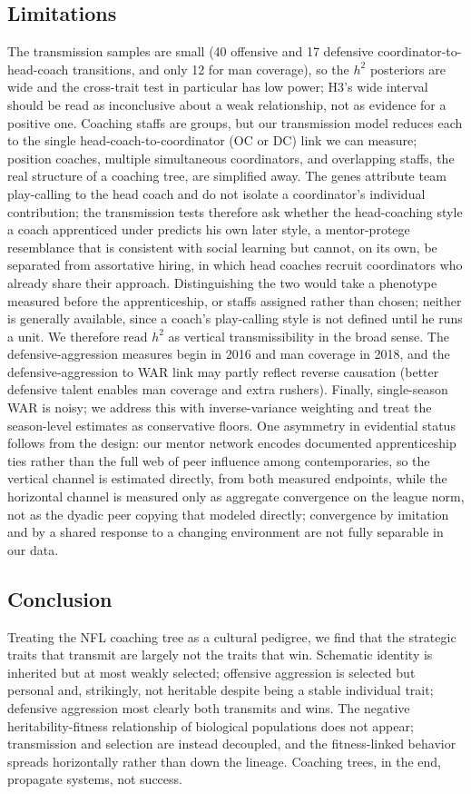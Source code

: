\documentclass[
  journal=ehs,
  manuscript=article,
  year=2026,
  volume=8,
]{cup-journal}
\begin{document}
\subsection{Limitations}
The transmission samples are small (40 offensive and 17 defensive
coordinator-to-head-coach transitions, and only 12 for man coverage), so the $h^{2}$
posteriors are wide and the
cross-trait test in particular has low power; H3's wide interval should be read as
inconclusive about a weak relationship, not as evidence for a positive one.
Coaching staffs are groups, but our transmission model reduces each to the single
head-coach-to-coordinator (OC or DC) link we can measure; position coaches, multiple
simultaneous coordinators, and overlapping staffs, the real structure of a coaching
tree, are simplified away. The genes attribute team play-calling to the head
coach and do not isolate a coordinator's individual contribution; the transmission
tests therefore ask whether the head-coaching style a coach apprenticed under
predicts his own later style, a mentor-protege resemblance that is consistent with
social learning but cannot, on its own, be separated from assortative hiring, in
which head coaches recruit coordinators who already share their approach.
Distinguishing the two would take a phenotype measured before the apprenticeship, or
staffs assigned rather than chosen; neither is generally available, since a coach's
play-calling style is not defined until he runs a unit. We therefore read $h^{2}$ as
vertical transmissibility in the broad sense. The
defensive-aggression measures begin in 2016 and man coverage in 2018, and the
defensive-aggression to WAR link may partly reflect reverse causation (better
defensive talent enables man coverage and extra rushers). Finally, single-season
WAR is noisy; we address this with inverse-variance weighting and treat the
season-level estimates as conservative floors. One asymmetry in evidential status
follows from the design: our mentor network encodes documented apprenticeship ties
rather than the full web of peer influence among contemporaries, so the vertical
channel is estimated directly, from both measured endpoints, while the horizontal
channel is measured only as aggregate convergence on the league norm, not as the
dyadic peer copying that \textcite{mesoudi2020} modeled directly; convergence by
imitation and by a shared response to a changing environment are not fully separable
in our data.

\subsection{Conclusion}
Treating the NFL coaching tree as a cultural pedigree, we find that the strategic
traits that transmit are largely not the traits that win. Schematic identity is
inherited but at most weakly selected; offensive aggression is selected but personal and,
strikingly, not heritable despite being a stable individual trait; defensive
aggression most clearly both transmits and wins. The negative heritability-fitness
relationship of biological populations does not appear; transmission and selection
are instead decoupled, and the fitness-linked behavior spreads horizontally rather
than down the lineage. Coaching trees, in the end, propagate systems, not success.
\end{document}
